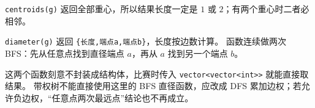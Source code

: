 \texttt{centroids(g)} 返回全部重心，所以结果长度一定是 $1$ 或 $2$；有两个重心时二者必相邻。

\texttt{diameter(g)} 返回 \texttt{\{长度,端点a,端点b\}}，长度按边数计算。
函数连续做两次 BFS：先从任意点找到直径端点 $a$，再从 $a$ 找到另一个端点 $b$。

这两个函数刻意不封装成结构体，比赛时传入 \texttt{vector<vector<int>>} 就能直接取结果。
带权树不能直接使用这里的 BFS 直径函数，应改成 DFS 累加边权；若允许负边权，“任意点两次最远点”结论也不再成立。
